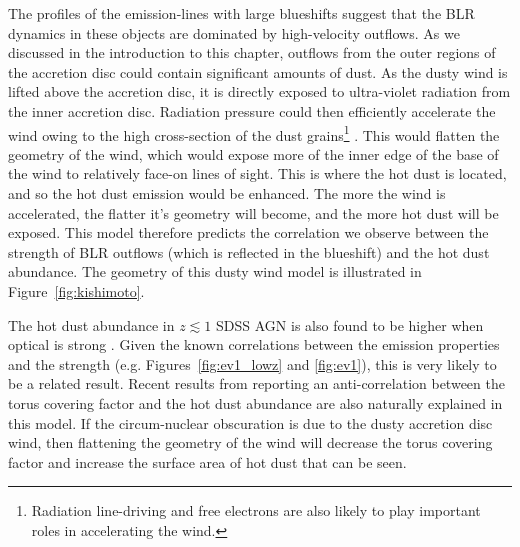 The profiles of the emission-lines with large  blueshifts suggest that the BLR dynamics in these objects are dominated by high-velocity outflows.
As we discussed in the introduction to this chapter, outflows from the outer regions of the accretion disc could contain significant amounts of dust.
As the dusty wind is lifted above the accretion disc, it is directly exposed to ultra-violet radiation from the inner accretion disc.
Radiation pressure could then efficiently accelerate the wind owing to the high cross-section of the dust grains\footnote{Radiation line-driving and free electrons are also likely to play important roles in accelerating the wind.} \citep[e.g.][]{fabian12}.
This would flatten the geometry of the wind, which would expose more of the inner edge of the base of the wind to relatively face-on lines of sight.
This is where the hot dust is located, and so the hot dust emission would be enhanced.
The more the wind is accelerated, the flatter it's geometry will become, and the more hot dust will be exposed.
This model therefore predicts the correlation we observe between the strength of BLR outflows (which is reflected in the  blueshift) and the hot dust abundance.
The geometry of this dusty wind model is illustrated in Figure~\ref{fig:kishimoto}.

The hot dust abundance in $z\lesssim1$ SDSS AGN is also found to be higher when optical  is strong \citep{shen14}.
Given the known correlations between the  emission properties and the  strength (e.g. Figures~\ref{fig:ev1_lowz} and \ref{fig:ev1}), this is very likely to be a related result.
Recent results from \citet{roseboom13} reporting an anti-correlation between the torus covering factor and the hot dust abundance are also naturally explained in this model.
If the circum-nuclear obscuration is due to the dusty accretion disc wind, then flattening the geometry of the wind will decrease the torus covering factor and increase the surface area of hot dust that can be seen.

